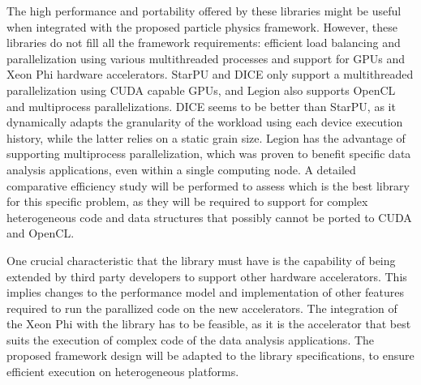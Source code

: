 The high performance and portability offered by these libraries might be useful when integrated with the proposed particle physics framework. However, these libraries do not fill all the framework requirements: efficient load balancing and parallelization using various multithreaded processes and support for GPUs and \intel Xeon Phi hardware accelerators. StarPU and DICE only support a multithreaded parallelization using CUDA capable GPUs, and Legion also supports OpenCL and multiprocess parallelizations. DICE seems to be better than StarPU, as it dynamically adapts the granularity of the workload using each device execution history, while the latter relies on a static grain size. Legion has the advantage of supporting multiprocess parallelization, which was proven to benefit specific data analysis applications, even within a single computing node. A detailed comparative efficiency study will be performed to assess which is the best library for this specific problem, as they will be required to support for complex heterogeneous code and data structures that possibly cannot be ported to CUDA and OpenCL.

One crucial characteristic that the library must have is the capability of being extended by third party developers to support other hardware accelerators. This implies changes to the performance model and implementation of other features required to run the parallized code on the new accelerators. The integration of the \intel Xeon Phi with the library has to be feasible, as it is the accelerator that best suits the execution of complex code of the data analysis applications. The proposed framework design will be adapted to the library specifications, to ensure efficient execution on heterogeneous platforms.
